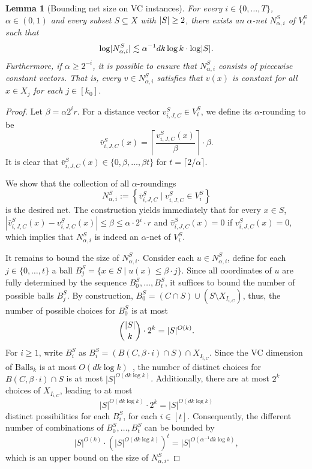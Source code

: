 \documentclass[11pt,letterpaper]{article}
\newtheorem{lemma}[theorem]{Lemma}
\theoremstyle{definition}
\DeclarePairedDelimiter{\abs}{\lvert}{\rvert}
\begin{document}
\begin{lemma}[Bounding net size on VC instances] 
\label{lemma_netsize}
For every $i\in \{0,\dots,T\}$, $\alpha\in (0,1)$ and every subset $S\subseteq X$ with $\abs{S}\geq 2$, there exists an $\alpha$-net $N^S_{\alpha,i}$ of $V^S_i$ such that
\[
\log \abs[big]{N^S_{\alpha,i}} \lesssim \alpha^{-1}d k\log k \cdot \log\abs{S}.
\]
Furthermore, if $\alpha\geq 2^{-i}$, it is possible to ensure that $N_{\alpha,i}^S$ consists of piecewise constant vectors. That is, every $v\in N_{\alpha,i}^S$ satisfies that $v(x)$ is constant for all $x\in X_j$ for each $j\in [k_0]$.
\end{lemma}

\begin{proof}

Let $\beta=\alpha 2^{i} r$. For a distance vector $v_{i,J,C}^S\in V_i^S$, we define its $\alpha$-rounding to be 
$$
\bar{v}_{i,J,C}^S(x) =  \left\lceil \frac{v_{i,J,C}^S(x)}{\beta} \right\rceil \cdot \beta.
$$
It is clear that $\bar{v}_{i,J,C}^S(x) \in \{0,\beta,\dots, \beta t\}$ for $t=\lceil 2/\alpha \rceil$.

We show that the collection of all $\alpha$-roundings
\[
    N_{\alpha,i}^S := \left\{\bar{v}_{i,J,C}^S\mid v_{i,J,C}^S\in V_i^S\right\}
\] 
is the desired net. 
The construction yields immediately that for every $x\in S$, $|\bar{v}_{i,J,C}^S(x)-v_{i,J,C}^S(x)|\leq \beta\leq \alpha\cdot 2^i\cdot r$ and $\bar{v}_{i,J,C}^S(x)=0$ if $v_{i,J,C}^S(x)=0$, which implies that $N_{\alpha,i}^S$ is indeed an $\alpha$-net of $V_i^S$. 

It remains to bound the size of $N_{\alpha,i}^S$. Consider each $u\in N_{\alpha,i}^S$, define for each $j\in \{0,\dots,t\}$ a ball $B_j^S=\{x\in S\mid u(x)\leq \beta \cdot j\}$. Since all coordinates of $u$ are fully determined by the sequence $B_0^S,\dots,B_t^S$, it suffices to bound the number of possible balls $B_j^S$. 
By construction, $B_0^S=(C\cap S)\cup (S\setminus X_{I_{i,C}})$, thus, the number of possible choices for $B_0^S$ is at most 
\[
    \binom{\abs{S}}{k}\cdot 2^k = |S|^{O(k)}.
\]
For $i\geq 1$, write $B_i^S$ as $B_i^S=(B(C, \beta\cdot i)\cap S)\cap X_{I_{i,C}}$. Since the VC dimension of $\mathrm{Balls}_k$ is at most $O(dk\log k)$~\cite{eisenstat2007vc}, the number of distinct choices for $B(C, \beta\cdot i)\cap S$ is
at most $|S|^{O(dk\log k)}$. Additionally, there are at most $2^k$ choices of $X_{I_{i,C}}$, leading to at most \[
    |S|^{O(dk\log k)}\cdot 2^k = |S|^{O(dk\log k)}
\]
distinct possibilities for each $B_i^S$, for each $i\in [t]$.
Consequently, the different number of combinations of $B_0^S,\dots,B_t^S$ can be bounded by 
\[
    |S|^{O(k)}\cdot (|S|^{O(dk\log k)})^{t}=|S|^{O(\alpha^{-1}dk\log k)},
\]
which is an upper bound on the size of $N_{\alpha,i}^S$.


\end{proof}
\end{document}
